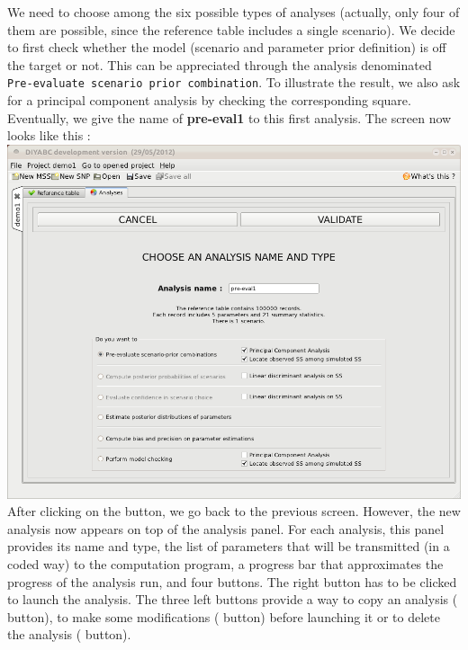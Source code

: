 We need to choose among the six possible types of analyses (actually, only four of them are possible, since the reference table includes a single scenario). We decide to first check whether the model (scenario and parameter prior definition) is off the target or not. This can be appreciated through the analysis denominated \texttt{Pre-evaluate scenario prior combination}. To illustrate the result, we also ask for a principal component analysis by checking the corresponding square. Eventually, we give the name of \textbf{pre-eval1} to this first analysis. The screen now looks like this :\\

\includegraphics[scale=0.35]{gui_pictures/Capture-DIYABC-29.png}\\ 

After clicking on the  button, we go back to the previous screen. However, the new analysis now appears on top of the analysis panel. For each analysis, this panel provides its name and type, the list of parameters that will be transmitted (in a coded way) to the computation program, a progress bar that approximates the progress of the analysis run, and four buttons. The right button has to be clicked to launch the analysis. The three left buttons provide a way to copy an analysis ( button), to make some modifications ( button) before launching it or to delete the analysis ( button).\\
 

